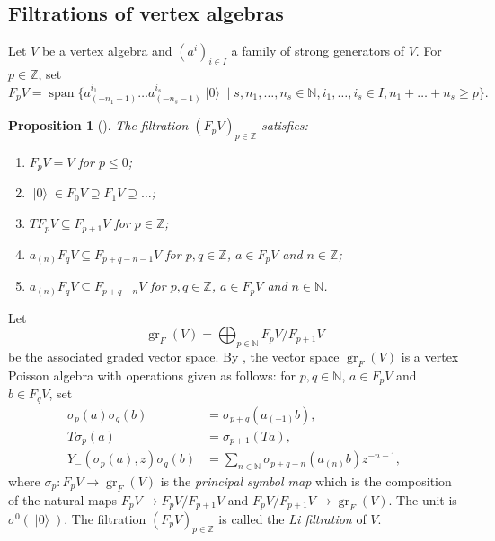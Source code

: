 \documentclass[a4paper, 12pt, reqno]{amsart}
\newtheorem{proposition}[theorem]{Proposition}
\theoremstyle{remark}
\numberwithin{equation}{subsection}
\DeclareMathOperator{\gr}{gr}
\DeclareMathOperator{\vspan}{span}
\DeclareMathOperator{\vac}{|0\rangle}
\begin{document}
\subsection{Filtrations of vertex algebras}
\label{sec:filtr-vert-algebr}

Let $V$ be a vertex algebra and $(a^i)_{i \in I}$ a family of strong generators of $V$.
For $p \in \mathbb{Z}$, set
\begin{equation*}
  F_pV = \vspan\{a^{i_1}_{(-n_1 - 1)}\dots a^{i_s}_{(-n_s - 1)}\vac \mid s, n_1, \dots, n_s \in \mathbb{N}, i_1, \dots, i_s \in I, n_1 + \dots + n_s \ge p\}.
\end{equation*}

\begin{proposition}[{\cite{li_abelianizing_2005}}]
  \label{prp:9}
  The filtration $(F_pV)_{p \in \mathbb{Z}}$ satisfies:
  \begin{enumerate}
  \item $F_pV = V$ for $p \le 0$;
  \item $\vac \in F_0V \supseteq F_1V \supseteq \dots$;
  \item $TF_pV \subseteq F_{p + 1}V$ for $p \in \mathbb{Z}$;
  \item $a_{(n)}F_qV \subseteq F_{p + q - n - 1}V$ for $p, q \in \mathbb{Z}$, $a \in F_pV$ and $n \in \mathbb{Z}$;
  \item $a_{(n)}F_qV \subseteq F_{p + q - n}V$ for $p, q \in \mathbb{Z}$, $a \in F_pV$ and $n \in \mathbb{N}$.
  \end{enumerate}
\end{proposition}

Let
\begin{equation*}
  \gr_F(V) = \bigoplus_{p \in \mathbb{N}}F_pV/F_{p + 1}V
\end{equation*}
be the associated graded vector space.
By \cite{li_abelianizing_2005}, the vector space $\gr_F(V)$ is a vertex Poisson algebra with operations given as follows: for $p, q \in \mathbb{N}$, $a \in F_pV$ and $b \in F_qV$, set
\begin{align*}
  \sigma_p(a)\sigma_q(b) &= \sigma_{p + q}(a_{(-1)}b), \\
  T\sigma_p(a) &= \sigma_{p + 1}(Ta), \\
  Y_-(\sigma_p(a), z)\sigma_q(b) &= \sum_{n \in \mathbb{N}}\sigma_{p + q - n}(a_{(n)}b)z^{-n - 1},
\end{align*}
where $\sigma_p: F_pV \to \gr_F(V)$ is the \emph{principal symbol map} which is the composition of the natural maps $F_pV \to F_pV/F_{p + 1}V$ and $F_pV/F_{p+1}V \to \gr_F(V)$.
The unit is $\sigma^0(\vac)$.
The filtration $(F_pV)_{p \in \mathbb{Z}}$ is called the \emph{Li filtration} of $V$.
\end{document}
